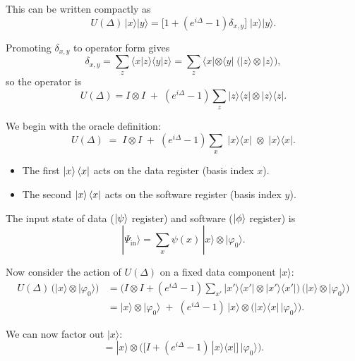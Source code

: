 \documentclass[12pt,a4paper]{article}
\begin{document}
This can be written compactly as
\begin{equation}
U(\Delta)\,|x\rangle|y\rangle =
\Big[1+(e^{i\Delta}-1)\delta_{x,y}\Big]\;|x\rangle|y\rangle .
\end{equation}

Promoting $\delta_{x,y}$ to operator form gives
\begin{equation}
\delta_{x,y} = \sum_{z} 
\langle x|z\rangle\langle y|z\rangle 
= \sum_{z} \langle x|\otimes \langle y| \;
\big(|z\rangle\otimes|z\rangle\big),
\end{equation}
so the operator is
\begin{equation}
U(\Delta) = I\otimes I \;+\; (e^{i\Delta}-1)\sum_{z} |z\rangle\langle z|\otimes|z\rangle\langle z| .
\end{equation}
\setlength{\parskip}{1em}


We begin with the oracle definition:
\begin{equation}
U(\Delta) \;=\; I \otimes I \;+\; (e^{i\Delta}-1)\sum_{x} \;|x\rangle\langle x|\;\otimes\;|x\rangle\langle x| .
\end{equation}
\begin{itemize}
    \item The first $\ket{x}\bra{x}$ acts on the data register (basis index $x$).
    \item The second $\ket{x}\bra{x}$ acts on the software register (basis index $y$).
\end{itemize}

\setlength{\parskip}{1em}

The input state of data ($\ket{\psi}$ register) and software ($\ket{\phi}$ register) is
\begin{equation}
|\Psi_{\text{in}}\rangle = \sum_{x} \psi(x)\,|x\rangle \otimes |\varphi_0\rangle .
\end{equation}

Now consider the action of $U(\Delta)$ on a fixed data component $|x\rangle$:
\begin{align}
U(\Delta)\,\big(|x\rangle \otimes |\varphi_0\rangle\big)
&= \Big(I \otimes I + (e^{i\Delta}-1)\sum_{x'} |x'\rangle\langle x'|\otimes |x'\rangle\langle x'|\Big)\,
\big(|x\rangle \otimes |\varphi_0\rangle\big) \\[6pt]
&= |x\rangle \otimes |\varphi_0\rangle \;+\;
(e^{i\Delta}-1)\,|x\rangle \otimes \big(|x\rangle\langle x|\,|\varphi_0\rangle\big) .
\end{align}

We can now factor out $|x\rangle$:
\begin{equation}
= |x\rangle \otimes \Big( \big[I + (e^{i\Delta}-1)\,|x\rangle\langle x|\big]\,|\varphi_0\rangle \Big).
\end{equation}
\end{document}
